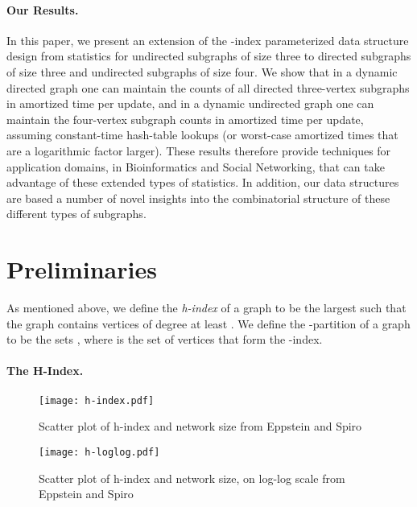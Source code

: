 \documentclass[11pt]{article}
\renewcommand{\subsection}[1]{\paragraph{\textbf{#1}.}}
\begin{document}
\subsection{Our Results}
In this paper,
we present an extension of the -index parameterized data structure
design from statistics for undirected subgraphs of size three to
directed subgraphs of size three and undirected subgraphs of size
four.
We show that in a dynamic directed graph one can maintain the
counts of all directed three-vertex subgraphs in  
amortized time per update, and in a dynamic undirected graph one
can maintain the four-vertex subgraph counts in  
amortized time per update, assuming constant-time hash-table lookups
(or worst-case amortized times that are a logarithmic factor larger).
These results therefore provide techniques for application domains,
in Bioinformatics and Social Networking,
that can take advantage of these extended types of statistics.
In addition, our data structures are based a number of novel insights
into the combinatorial structure
of these different types of subgraphs.

\section{Preliminaries}
As mentioned above, we define the \emph{h-index}
of a graph to be the largest  such that the graph contains  vertices
of degree at least . We define the -partition of a graph to be
the sets , where  is the set of vertices that 
form the -index.

\subsection{The H-Index}


\begin{figure}[hb!]
\vspace{-24pt}
\begin{center}
\texttt{[image: h-index.pdf]}
\end{center}
\vspace{-24pt}
\caption{Scatter plot of h-index and network size from Eppstein and Spiro~\cite{es-hgadssarx-09}}
\label{fig-h-index}
\vspace{-18pt}
\end{figure}

\begin{figure}[hb!]
\vspace{-24pt}
\begin{center}
\texttt{[image: h-loglog.pdf]}
\end{center}
\vspace{-24pt}
\caption{Scatter plot of h-index and network size, on log-log scale from Eppstein and Spiro~\cite{es-hgadssarx-09}}
\label{fig-h-loglog}
\vspace{-18pt}
\end{figure}
\end{document}
